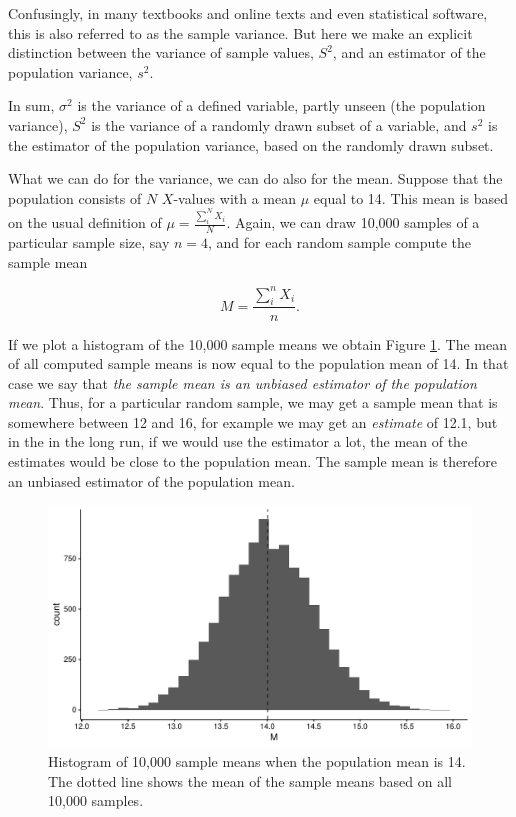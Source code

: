 \documentclass[]{book}\usepackage[]{graphicx}\usepackage[]{color}
\makeatletter
\def\maxwidth{ %
  \ifdim\Gin@nat@width>\linewidth
    \linewidth
  \else
    \Gin@nat@width
  \fi
}
\newenvironment{knitrout}{}{} %
\makeatother
\begin{document}
Confusingly, in many textbooks and online texts and even statistical software, this is also referred to as the sample variance. But here we make an explicit distinction between the variance of sample values, $S^2$, and an estimator of the population variance, $s^2$.


In sum, $\sigma^2$ is the variance of a defined variable, partly unseen (the population variance), $S^2$ is the variance of a randomly drawn subset of a variable, and $s^2$ is the estimator of the population variance, based on the randomly drawn subset.

What we can do for the variance, we can do also for the mean. Suppose that the population consists of $N$ $X$-values with a mean $\mu$ equal to 14. This mean is based on the usual definition of $\mu = \frac{\sum_i^N X_i}{N}$. Again, we can draw 10,000 samples of a particular sample size, say $n=4$, and for each random sample compute the sample mean

\begin{equation}
M = \frac{\sum_i^n X_i}{n}.
\end{equation}


If we plot a histogram of the 10,000 sample means we obtain Figure \ref{fig:sample_mean}. The mean of all computed sample means is now equal to the population mean of 14. In that case we say that \textit{the sample mean is an unbiased estimator of the population mean}. Thus, for a particular random sample, we may get a sample mean that is somewhere between 12 and 16, for example we may get an \textit{estimate} of 12.1, but in the in the long run, if we would use the estimator a lot, the mean of the estimates would be close to the population mean. The sample mean is therefore an unbiased estimator of the population mean.

\begin{knitrout}
\color{fgcolor}\begin{figure}

{\centering \includegraphics[width=\maxwidth]{figure/sample_mean-1} 

}

\caption[Histogram of 10,000 sample means when the population mean is 14]{Histogram of 10,000 sample means when the population mean is 14. The dotted line shows the mean of the sample means based on all 10,000 samples.}\label{fig:sample_mean}
\end{figure}


\end{knitrout}
\end{document}
